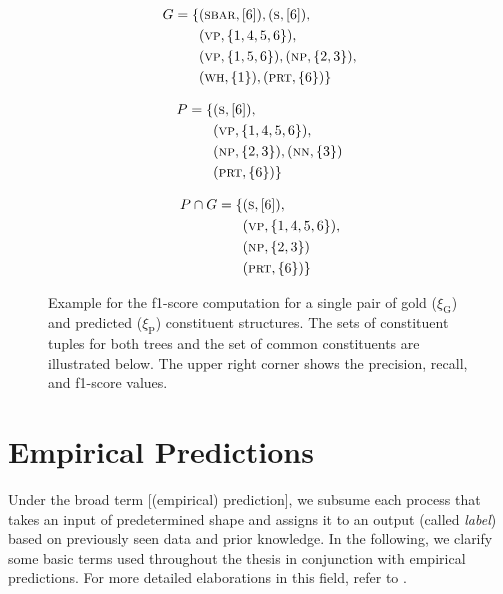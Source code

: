 \documentclass[../document.tex]{subfiles}
\begin{document}
\begin{figure}
        \begin{minipage}{.35\linewidth}
            \small
            \begin{align*}
                G = \{
                &(\textsc{sbar}, [6]),
                (\textsc{s}, [6]), \\
                &(\textsc{vp}, \{1,4,5,6\}),\\
                &(\textsc{vp}, \{1,5,6\}),
                (\textsc{np}, \{2,3\}), \\
                &(\textsc{wh}, \{1\}),
                (\textsc{prt}, \{6\}) \}
            \end{align*}
        \end{minipage}
        \hfill
        \begin{minipage}{.3\linewidth}
            \small
            \begin{align*}
                P = \{
                &(\textsc{s}, [6]), \\
                &(\textsc{vp}, \{1,4,5,6\}),\\
                &(\textsc{np}, \{2,3\}),
                (\textsc{nn}, \{3\}) \\
                &(\textsc{prt}, \{6\}) \}
            \end{align*}
        \end{minipage}
        \hfill
        \begin{minipage}{.3\linewidth}
            \small
            \begin{align*}
                P \cap G = \{
                &(\textsc{s}, [6]), \\
                &(\textsc{vp}, \{1,4,5,6\}),\\
                &(\textsc{np}, \{2,3\}) \\
                &(\textsc{prt}, \{6\}) \}
            \end{align*}
        \end{minipage}

        \caption{
            Example for the f1-score computation for a single pair of gold (\(\xi_\text{G}\)) and predicted (\(\xi_\text{P}\)) constituent structures.
            The sets of constituent tuples for both trees and the set of common constituents are illustrated below.
            The upper right corner shows the precision, recall, and f1-score values.
        }
    \end{figure}

    \section{Empirical Predictions}
    Under the broad term [(empirical) prediction], we subsume each process that takes an input of predetermined shape and assigns it to an output (called \emph{label}) based on previously seen data and prior knowledge.
    In the following, we clarify some basic terms used throughout the thesis in conjunction with empirical predictions.
    For more detailed elaborations in this field, refer to .
\end{document}
